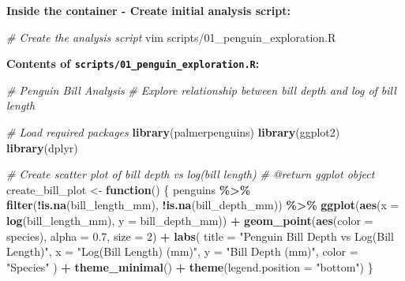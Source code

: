 \documentclass[
]{article}
\newenvironment{Shaded}{\begin{snugshade}}{\end{snugshade}}
\newcommand{\AttributeTok}[1]{\textcolor[rgb]{0.13,0.29,0.53}{#1}}
\newcommand{\CommentTok}[1]{\textcolor[rgb]{0.56,0.35,0.01}{\textit{#1}}}
\newcommand{\ControlFlowTok}[1]{\textcolor[rgb]{0.13,0.29,0.53}{\textbf{#1}}}
\newcommand{\DecValTok}[1]{\textcolor[rgb]{0.00,0.00,0.81}{#1}}
\newcommand{\ExtensionTok}[1]{#1}
\newcommand{\FloatTok}[1]{\textcolor[rgb]{0.00,0.00,0.81}{#1}}
\newcommand{\FunctionTok}[1]{\textcolor[rgb]{0.13,0.29,0.53}{\textbf{#1}}}
\newcommand{\NormalTok}[1]{#1}
\newcommand{\OtherTok}[1]{\textcolor[rgb]{0.56,0.35,0.01}{#1}}
\newcommand{\SpecialCharTok}[1]{\textcolor[rgb]{0.81,0.36,0.00}{\textbf{#1}}}
\newcommand{\StringTok}[1]{\textcolor[rgb]{0.31,0.60,0.02}{#1}}
\begin{document}
\textbf{Inside the container - Create initial analysis script:}

\begin{Shaded}
\begin{Highlighting}[]
\CommentTok{\# Create the analysis script}
\ExtensionTok{vim}\NormalTok{ scripts/01\_penguin\_exploration.R}
\end{Highlighting}
\end{Shaded}

\textbf{Contents of \texttt{scripts/01\_penguin\_exploration.R}:}

\begin{Shaded}
\begin{Highlighting}[]
\CommentTok{\#\textquotesingle{} Penguin Bill Analysis}
\CommentTok{\#\textquotesingle{} Explore relationship between bill depth and log of bill length}

\CommentTok{\# Load required packages}
\FunctionTok{library}\NormalTok{(palmerpenguins)}
\FunctionTok{library}\NormalTok{(ggplot2)}
\FunctionTok{library}\NormalTok{(dplyr)}

\CommentTok{\#\textquotesingle{} Create scatter plot of bill depth vs log(bill length)}
\CommentTok{\#\textquotesingle{} @return ggplot object}
\NormalTok{create\_bill\_plot }\OtherTok{\textless{}{-}} \ControlFlowTok{function}\NormalTok{() \{}
\NormalTok{  penguins }\SpecialCharTok{\%\textgreater{}\%}
    \FunctionTok{filter}\NormalTok{(}\SpecialCharTok{!}\FunctionTok{is.na}\NormalTok{(bill\_length\_mm), }\SpecialCharTok{!}\FunctionTok{is.na}\NormalTok{(bill\_depth\_mm)) }\SpecialCharTok{\%\textgreater{}\%}
    \FunctionTok{ggplot}\NormalTok{(}\FunctionTok{aes}\NormalTok{(}\AttributeTok{x =} \FunctionTok{log}\NormalTok{(bill\_length\_mm), }\AttributeTok{y =}\NormalTok{ bill\_depth\_mm)) }\SpecialCharTok{+}
    \FunctionTok{geom\_point}\NormalTok{(}\FunctionTok{aes}\NormalTok{(}\AttributeTok{color =}\NormalTok{ species), }\AttributeTok{alpha =} \FloatTok{0.7}\NormalTok{, }\AttributeTok{size =} \DecValTok{2}\NormalTok{) }\SpecialCharTok{+}
    \FunctionTok{labs}\NormalTok{(}
      \AttributeTok{title =} \StringTok{"Penguin Bill Depth vs Log(Bill Length)"}\NormalTok{,}
      \AttributeTok{x =} \StringTok{"Log(Bill Length) (mm)"}\NormalTok{,}
      \AttributeTok{y =} \StringTok{"Bill Depth (mm)"}\NormalTok{,}
      \AttributeTok{color =} \StringTok{"Species"}
\NormalTok{    ) }\SpecialCharTok{+}
    \FunctionTok{theme\_minimal}\NormalTok{() }\SpecialCharTok{+}
    \FunctionTok{theme}\NormalTok{(}\AttributeTok{legend.position =} \StringTok{"bottom"}\NormalTok{)}
\NormalTok{\}}


\end{Highlighting}
\end{Shaded}
\end{document}
